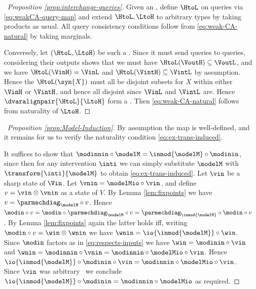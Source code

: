 \documentclass{article}
\begin{document}
{\begin{proof}[\proofof~Proposition \ref{prop:interchange-queries}]
Given an \rl{\restrictedCCA}, define $\HtoL$ on queries via \eqref{eq:weakCA-query-map} and extend $\HtoL, \LtoH$ to arbitrary types by taking products as usual. All query consistency conditions follow from \eqref{eq:weak-CA-natural} by taking marginals. 

Conversely, let $(\HtoL, \LtoH)$ be such a \qdown{}. Since it must send queries to queries, considering their outputs shows that we must have $\HtoL(\VoutH) \subseteq \VoutL$, and we have $\HtoL(\VinH) = \VinL$ and $\HtoL(\VintH) \subseteq \VintL$ by assumption. Hence the $\HtoL(\syn{X})$ must all be disjoint subsets for $X$ within either $\VinH$ or $\VintH$, and hence all disjoint since $\VinL$ and $\VintL$ are. Hence $\dvaralignpair{\HtoL}{\LtoH}$ form a \varalign. Then \eqref{eq:weak-CA-natural} follows from naturality of $\LtoH$.
\end{proof}


\begin{proof}[\proofof~Proposition \ref{prop:Model-Induction}]

By assumption the map is well-defined, and it remains for us to verify the naturality condition \eqref{eq:ex-trans-induced}. 

It suffices to show that $\modinnin \circ \modelM = \inmod{\modelM} \circ \modinin$, since then for any intervention $\inti$ we can simply substitute $\modelM$ with 
$\transform{\inti}{\modelM}$ to obtain \eqref{eq:ex-trans-induced}. Let $\vin$ be a sharp state of $\Vin$. Let $\vnin = \modelMio \circ \vin$, and define $v = \vin \otimes \vnin$ as a state of $V$. By Lemma \ref{lem:fixpoints} we have $v = \parmechdiag_\modelM \circ v$. Hence $\modin \circ v = \modin \circ \parmechdiag_\modelM \circ v = \parmechdiag_{\inmod{\modelM}} \circ \modin \circ v$.  By Lemma \ref{lem:fixpoints} again the latter holds iff, writing $\modin \circ v = \win \otimes \wnin$ we have $\wnin = \io{\inmod{\modelM}} \circ \win$. Since $\modin$ factors as in \eqref{eq:respects-inputs} we have $\win = \modinin \circ \vin$ and $\wnin = \modinnin \circ \vnin = \modinnin \circ \modelMio \circ \vin$. Hence $\io{\inmod{\modelM}} \circ \modinin \circ \vin = \modinnin \circ \modelMio \circ \vin$. Since $\vin$ was arbitrary \ we conclude $\io{\inmod{\modelM}} \circ \modinin = \modinnin \circ \modelMio$ as required. 
\end{proof}

}
\end{document}
